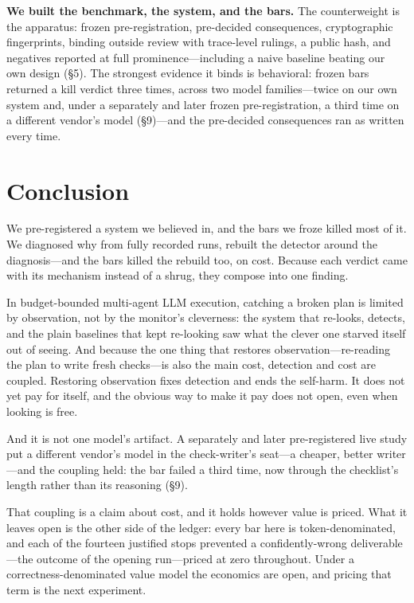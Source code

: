 \documentclass[acmsmall,screen]{acmart}
\begin{document}
\textbf{We built the benchmark, the system, and the bars.} The counterweight is
the apparatus: frozen pre-registration, pre-decided consequences, cryptographic
fingerprints, binding outside review with trace-level rulings, a public hash,
and negatives reported at full prominence---including a naive baseline beating
our own design (\S5). The strongest evidence it binds is behavioral: frozen bars
returned a kill verdict three times, across two model families---twice on our own
system and, under a separately and later frozen pre-registration, a third time on
a different vendor's model (\S9)---and the pre-decided consequences ran as written
every time.

\section{Conclusion}
We pre-registered a system we believed in, and the bars we froze killed most of
it. We diagnosed why from fully recorded runs, rebuilt the detector around the
diagnosis---and the bars killed the rebuild too, on cost. Because each verdict
came with its mechanism instead of a shrug, they compose into one finding.

In budget-bounded multi-agent LLM execution, catching a broken plan is limited
by observation, not by the monitor's cleverness: the system that re-looks,
detects, and the plain baselines that kept re-looking saw what the clever one
starved itself out of seeing. And because the one thing that restores
observation---re-reading the plan to write fresh checks---is also the main cost,
detection and cost are coupled. Restoring observation fixes detection and ends
the self-harm. It does not yet pay for itself, and the obvious way to make it
pay does not open, even when looking is free.

And it is not one model's artifact. A separately and later pre-registered live
study put a different vendor's model in the check-writer's seat---a cheaper,
better writer---and the coupling held: the bar failed a third time, now through
the checklist's length rather than its reasoning (\S9).

That coupling is a claim about cost, and it holds however value is priced. What
it leaves open is the other side of the ledger: every bar here is
token-denominated, and each of the fourteen justified stops prevented a
confidently-wrong deliverable---the outcome of the opening run---priced at zero
throughout. Under a correctness-denominated value model the economics are open,
and pricing that term is the next experiment.
\end{document}
